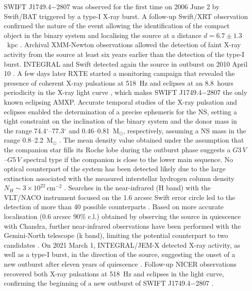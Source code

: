 \documentclass[fleqn,usenatbib]{mnras}
\newcommand{\swiftj}{SWIFT J1749.4$-$2807}
\newcommand{\nicer}{NICER}
\newcommand{\xmm}{XMM-Newton}
\newcommand{\rxte}{RXTE}
\newcommand{\chandra}{Chandra}
\newcommand{\swift}{Swift}
\newcommand{\inte}{INTEGRAL}
\begin{document}
\swiftj{} was observed for the first time on 2006 June 2 by \swift{}/BAT \citep{Schady2006} triggered by a type-I X-ray burst. A follow-up \swift{}/XRT observation confirmed the nature of the event allowing the identification of the compact object in the binary system and localising the source at a distance $d=6.7\pm1.3$~kpc \citep[however, no sign of photospheric radius expansion was detected for this type-I burst, therefore this value should be considered as an upper limit][]{Wijnands:2009wa,Campana:2009va}. Archival \xmm{} observations allowed the detection of faint X-ray activity from the source at least six years earlier than the detection of the type-I burst. 
\inte{} and \swift{} detected again the source in outburst on 2010 April 10 \citep{Pavan2010,Chenevez2010}. A few days later \rxte{} started a monitoring campaign that revealed the presence of coherent X-ray pulsations at 518~Hz \citep{Altamirano2010} and eclipses at an 8.8~hours periodicity in the X-ray light curve \citep{Markwardt2010}, which makes \swiftj{} the only known eclipsing AMXP. Accurate temporal studies of the X-ray pulsation and eclipses enabled the determination of a precise ephemeris for the NS, setting a tight constraint on the inclination of the binary system and the donor mass in the range 74.4$^\circ$--77.3$^\circ$ and 0.46--0.81~M$_\odot$, respectively, assuming a NS mass in the range 0.8--2.2~M$_\odot$ \citep[][]{Markwardt:2010tl,Altamirano:2011uq}. The mean density value obtained under the assumption that the companion star fills its Roche lobe during the outburst phase suggests a $G3\,V$--$G5\,V$ spectral type if the companion is close to the lower main sequence. No optical counterpart of the system has been detected likely due to the large extinction associated with the measured interstellar hydrogen column density $N_H\sim3 \times 10^{22}\,\text{cm}^{-2}$ \citep{Ferrigno:2011wz}. Searches in the near-infrared (H band) with the VLT/NACO instrument focused on the 1.6 arcsec \swift{} error circle led to the detection of more than 40 possible counterparts \citep{DAvanzo:2011tq}. Based on more accurate localisation (0.6 arcsec 90\% c.l.) obtained by observing the source in quiescence with \chandra{}, further near-infrared observations have been performed with the Gemini-North telescope (k band),  limiting the potential counterpart to two candidates \citep{Jonker:2013wp}. 
On 2021 March 1, \inte{}/JEM-X detected X-ray activity, as well as a type-I burst, in the direction of the source, suggesting the onset of a new outburst after eleven years of quiescence \citep{Mereminskiy2021}. Follow-up \nicer{} observations recovered both X-ray pulsations at 518~Hz and eclipses in the light curve, confirming the beginning of a new outburst of \swiftj{} \citep{Bult:2021wk}.
\end{document}
